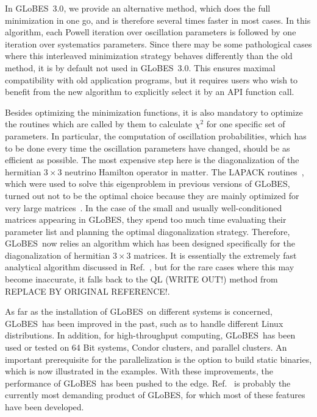 \documentclass[12pt,a4paper]{article}
\newcommand{\Ref}{Ref.}
\newcommand{\GLOBES}{{\sf GLoBES}}
\newcommand{\GLOBESN}{{\sf GLoBES~3.0}}
\begin{document}
In \GLOBESN , we provide an alternative method, which does the full minimization
in one go, and is therefore several times faster in most cases. In this algorithm,
each Powell iteration over oscillation parameters is followed by one iteration
over systematics parameters. Since there may be some pathological cases where this
interleaved minimization strategy behaves differently than the old method,
it is by default not used in \GLOBESN . This ensures maximal compatibility
with old application programs, but it requires users who wish to benefit from the
new algorithm to explicitly select it by an API function call.

Besides optimizing the minimization functions, it is also mandatory to
optimize the routines which are called by them to calculate $\chi^2$
for one specific set of parameters. In particular, the computation of
oscillation probabilities, which has to be done every time the oscillation
parameters have changed, should be as efficient as possible. The most expensive
step here is the diagonalization of the hermitian $3\times3$ neutrino Hamilton
operator in matter. The LAPACK routines~\cite{Anderson:LAPACK}, which were
used to solve this eigenproblem in previous versions of \GLOBES, turned out
not to be the optimal choice because they are mainly optimized for very large
matrices~\cite{Kopp:2006wp}. In the case of the small and usually well-conditioned
matrices appearing in \GLOBES, they spend too much time evaluating their parameter
list and planning the optimal diagonalization strategy. Therefore, \GLOBES\ now
relies an algorithm which has been designed specifically for the diagonalization
of hermitian $3\times3$ matrices. It is essentially the extremely fast analytical
algorithm discussed in \Ref~\cite{Kopp:2006wp}, but for the rare cases where this may become
inaccurate, it falls back to the QL (WRITE OUT!)
method from~\cite{Press:NumRecip} REPLACE BY ORIGINAL REFERENCE!.

As far as the installation of \GLOBES\ on different systems is concerned, \GLOBES\
has been improved in the past, such as to handle different Linux distributions.
In addition, for high-throughput computing, \GLOBES\ has been used or tested
on 64 Bit systems, Condor clusters, and parallel clusters. An important prerequisite
for the parallelization is the option to build static binaries, which is now
illustrated in the examples. With these improvements, the performance of \GLOBES\
has been pushed to the edge. \Ref~\cite{Huber:2006wb} is probably the currently
most demanding product of \GLOBES , for which most of these features
have been developed.
\end{document}
